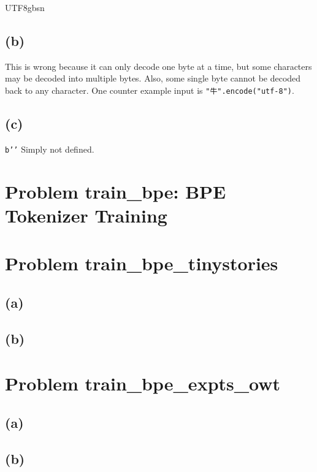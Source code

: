 \documentclass{article}
\newcommand{\code}[1]{\texttt{#1}}
\begin{document}
\begin{CJK}{UTF8}{gbsn}
\subsection*{(b)}
This is wrong because it can only decode one byte at a time, but some characters may be decoded into multiple bytes. Also, some single byte cannot be decoded back to any character.
One counter example input is \code{"牛".encode("utf-8")}.
\subsection*{(c)}
\code{b''}
Simply not defined.
\section*{Problem train\_bpe: BPE Tokenizer Training}

\section*{Problem train\_bpe\_tinystories}

\subsection*{(a)}

\subsection*{(b)}

\section*{Problem train\_bpe\_expts\_owt}

\subsection*{(a)}

\subsection*{(b)}


\end{CJK}
\end{document}
